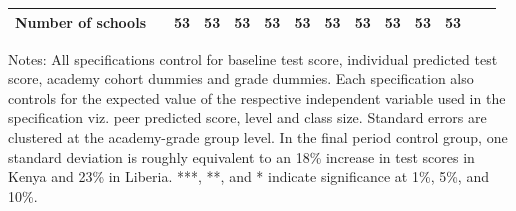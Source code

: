 \begin{center}
\begin{tiny}
\begin{threeparttable}
\begin{tabular} {@{} l l c c c c c c c c c c c c @{}}
Number of schools &  & 53 & 53 & 53 & 53 & 53 & 53 & 53 & 53 & 53 & 53 \\
\bottomrule
\end{tabular}
\begin{tablenotes}
\item Notes: All specifications control for baseline test score, individual predicted test score, academy cohort dummies and grade dummies. Each specification also controls for the expected value of the respective independent variable used in the specification viz. peer predicted score, level and class size. Standard errors are clustered at the academy-grade group level. In the final period control group, one standard deviation is roughly equivalent to an 18\% increase in test scores in Kenya and 23\% in Liberia. ***, **, and * indicate significance at 1\%, 5\%, and 10\%.\end{tablenotes}
\end{threeparttable}
\end{tiny}
\end{center}
\clearpage
